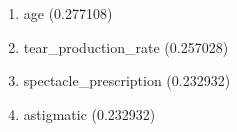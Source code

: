 \begin{enumerate}
\item age (0.277108)
\item tear\_production\_rate (0.257028)
\item spectacle\_prescription (0.232932)
\item astigmatic (0.232932)
\end{enumerate}